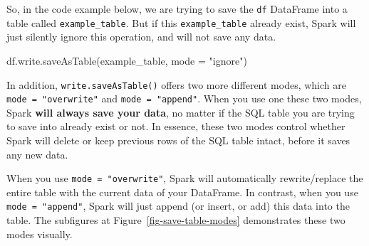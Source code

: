 \documentclass[
  11pt,
  letterpaper,
  DIV=11,
  numbers=noendperiod]{scrreprt}
\newenvironment{Shaded}{\begin{snugshade}}{\end{snugshade}}
\newcommand{\NormalTok}[1]{\textcolor[rgb]{0.00,0.23,0.31}{#1}}
\newcommand{\OperatorTok}[1]{\textcolor[rgb]{0.37,0.37,0.37}{#1}}
\newcommand{\StringTok}[1]{\textcolor[rgb]{0.13,0.47,0.30}{#1}}
\begin{document}
So, in the code example below, we are trying to save the \texttt{df}
DataFrame into a table called \texttt{example\_table}. But if this
\texttt{example\_table} already exist, Spark will just silently ignore
this operation, and will not save any data.

\begin{Shaded}
\begin{Highlighting}[]
\NormalTok{df.write.saveAsTable(}\StringTok{\textquotesingle{}example\_table\textquotesingle{}}\NormalTok{, mode }\OperatorTok{=} \StringTok{"ignore"}\NormalTok{)}
\end{Highlighting}
\end{Shaded}

In addition, \texttt{write.saveAsTable()} offers two more different
modes, which are \texttt{mode\ =\ "overwrite"} and
\texttt{mode\ =\ "append"}. When you use one these two modes, Spark
\textbf{will always save your data}, no matter if the SQL table you are
trying to save into already exist or not. In essence, these two modes
control whether Spark will delete or keep previous rows of the SQL table
intact, before it saves any new data.

When you use \texttt{mode\ =\ "overwrite"}, Spark will automatically
rewrite/replace the entire table with the current data of your
DataFrame. In contrast, when you use \texttt{mode\ =\ "append"}, Spark
will just append (or insert, or add) this data into the table. The
subfigures at Figure~\ref{fig-save-table-modes} demonstrates these two
modes visually.
\end{document}
